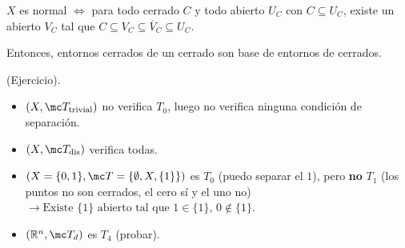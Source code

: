 \begin{prop}
    $X$ es normal $\iff$ para todo cerrado $C$ y todo abierto $U_C$ con $C \subseteq U_C$, existe un abierto $V_C$ tal que $C \subseteq V_C \subseteq \overline{V}_C \subseteq U_C$.
    
    Entonces, entornos cerrados de un cerrado son base de entornos de cerrados.
\end{prop}

\begin{dem}
    (Ejercicio).
\end{dem}

\begin{ejem}
    \hfill
    \begin{itemize}
        \item $(X, \mc T_{\text{trivial}})$ no verifica $T_0$, luego no verifica ninguna condición de separación.
        \item $(X, \mc T_{\text{dis}})$ verifica todas.
        \item $(X = \{0, 1\}, \mc T = \{\emptyset, X, \{1\}\})$ es $T_0$ (puedo separar el $1$), pero \textbf{no} $T_1$ (los puntos no son cerrados, el cero sí y el uno no) $\rightarrow \text{Existe } \{1\} \text{ abierto tal que } 1 \in \{1\}, \, 0 \notin \{1\}$.
        \item $(\mathbb{R}^n, \mc T_d)$ es $T_4$ (probar).
    \end{itemize}
\end{ejem}




















































